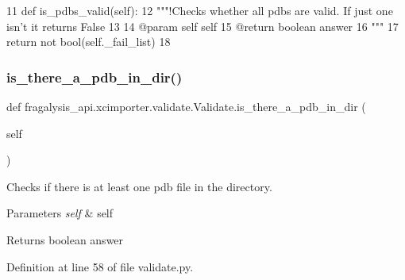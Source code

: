 \begin{DoxyCode}
11     \textcolor{keyword}{def }is\_pdbs\_valid(self):
12         \textcolor{stringliteral}{"""!Checks whether all pdbs are valid. If just one isn't it returns False}
13 \textcolor{stringliteral}{        }
14 \textcolor{stringliteral}{        @param self self}
15 \textcolor{stringliteral}{        @return boolean answer}
16 \textcolor{stringliteral}{        """}
17         \textcolor{keywordflow}{return} \textcolor{keywordflow}{not} bool(self.\_fail\_list)
18 
\end{DoxyCode}
\mbox{\label{classfragalysis__api_1_1xcimporter_1_1validate_1_1_validate_a7203bedad575f779345a78f7880a58a2}} 
\subsubsection{\texorpdfstring{is\+\_\+there\+\_\+a\+\_\+pdb\+\_\+in\+\_\+dir()}{is\_there\_a\_pdb\_in\_dir()}}
{\footnotesize\ttfamily def fragalysis\+\_\+api.\+xcimporter.\+validate.\+Validate.\+is\+\_\+there\+\_\+a\+\_\+pdb\+\_\+in\+\_\+dir (\begin{DoxyParamCaption}\item[{}]{self }\end{DoxyParamCaption})}



Checks if there is at least one pdb file in the directory. 


\begin{DoxyParams}{Parameters}
{\em self} & self \\
\hline
\end{DoxyParams}
\begin{DoxyReturn}{Returns}
boolean answer 
\end{DoxyReturn}


Definition at line 58 of file validate.\+py.


